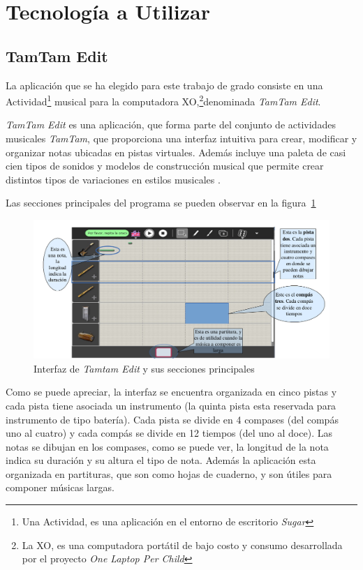\section{Tecnolog\'ia a Utilizar}
\label{sec:tecnologia-utilizada}

\subsection{TamTam Edit}

La aplicaci\'on que se ha elegido para este trabajo de grado consiste en una
Actividad\footnote{Una Actividad, es una aplicaci\'on en el entorno de escritorio \emph{Sugar}}
musical para la
computadora
XO,\footnote{La XO, es una computadora port\'atil de bajo costo y consumo desarrollada por el proyecto \emph{One Laptop Per Child}}denominada \emph{TamTam Edit}.

\emph{TamTam Edit} es una aplicaci\'on, que forma parte del conjunto de actividades musicales \emph{TamTam}, que proporciona
una interfaz intuitiva para crear, modificar y organizar notas ubicadas en pistas virtuales. Adem\'as incluye una paleta de
casi cien tipos de sonidos y modelos de construcci\'on musical que permite crear distintos tipos de variaciones en estilos
musicales \cite{TamTamWiki}.

Las secciones principales del programa se pueden observar en la figura~\ref{figure:ui-tamtam} 

\begin{figure}[H]
\centering
\includegraphics[width=\textwidth]{./graphics/ui-tamtam-edit.png}
\caption{Interfaz de \emph{Tamtam Edit} y sus secciones principales}
\label{figure:ui-tamtam}
\end{figure}

Como se puede apreciar, la interfaz se encuentra organizada en cinco pistas y cada pista tiene asociada un 
instrumento (la quinta pista esta reservada para instrumento de tipo batería). Cada pista se divide en 4 
compases (del compás uno al cuatro) y cada compás se divide en 12 tiempos (del uno al doce). 
Las notas se dibujan en los compases, como se puede ver, la longitud de la nota indica su duración y su 
altura el tipo de nota. Además la aplicación esta organizada en partituras, que son como hojas de 
cuaderno, y son útiles para componer músicas largas.

